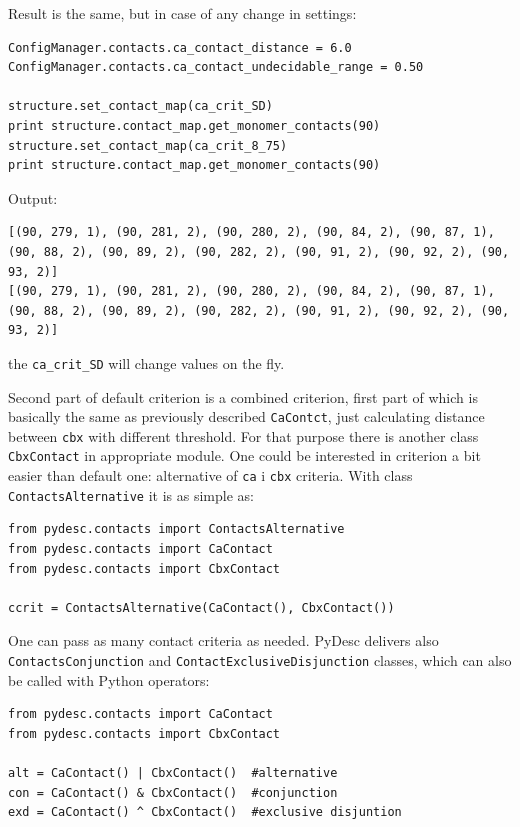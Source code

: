 \documentclass{article}
\begin{document}
Result is the same, but in case of any change in settings:

\begin{lstlisting}
ConfigManager.contacts.ca_contact_distance = 6.0
ConfigManager.contacts.ca_contact_undecidable_range = 0.50

structure.set_contact_map(ca_crit_SD)
print structure.contact_map.get_monomer_contacts(90)
structure.set_contact_map(ca_crit_8_75)
print structure.contact_map.get_monomer_contacts(90)
\end{lstlisting}
Output:
\begin{lstlisting}
[(90, 279, 1), (90, 281, 2), (90, 280, 2), (90, 84, 2), (90, 87, 1), (90, 88, 2), (90, 89, 2), (90, 282, 2), (90, 91, 2), (90, 92, 2), (90, 93, 2)]
[(90, 279, 1), (90, 281, 2), (90, 280, 2), (90, 84, 2), (90, 87, 1), (90, 88, 2), (90, 89, 2), (90, 282, 2), (90, 91, 2), (90, 92, 2), (90, 93, 2)]
\end{lstlisting}

the \texttt{ca\_crit\_SD} will change values on the fly.

Second part of default criterion is a combined criterion, first part of which is basically the same as previously described \texttt{CaContct}, just calculating distance between \texttt{cbx} with different threshold. For that purpose there is another class \texttt{CbxContact} in appropriate module. One could be interested in criterion a bit easier than default one: alternative of \texttt{ca} i \texttt{cbx} criteria. With class \texttt{ContactsAlternative} it is as simple as:

\begin{lstlisting}
from pydesc.contacts import ContactsAlternative
from pydesc.contacts import CaContact
from pydesc.contacts import CbxContact

ccrit = ContactsAlternative(CaContact(), CbxContact())
\end{lstlisting}

One can pass as many contact criteria as needed. PyDesc delivers also \texttt{ContactsConjunction} and \texttt{ContactExclusiveDisjunction} classes, which can also be called with Python operators:

\begin{lstlisting}
from pydesc.contacts import CaContact
from pydesc.contacts import CbxContact

alt = CaContact() | CbxContact()  #alternative
con = CaContact() & CbxContact()  #conjunction
exd = CaContact() ^ CbxContact()  #exclusive disjuntion
\end{lstlisting}
\end{document}
